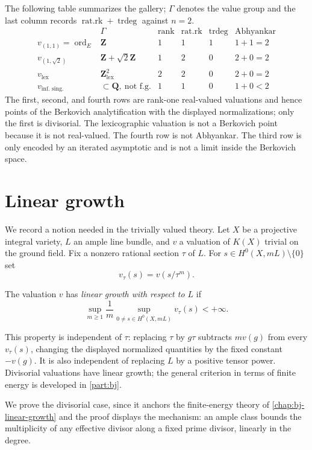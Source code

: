 The following table summarizes the gallery; $\Gamma$ denotes the value
group and the last column records
$\operatorname{rat.rk}+\operatorname{trdeg}$ against $n=2$.
\[
\begin{array}{l|c|c|c|c|c}
 &\Gamma&\operatorname{rank}&\operatorname{rat.rk}
 &\operatorname{trdeg}&\text{Abhyankar}\\
\hline
 v_{(1,1)}=\operatorname{ord}_E
 &\mathbf Z&1&1&1&1+1=2\\
 v_{(1,\sqrt2)}
 &\mathbf Z+\sqrt2\mathbf Z&1&2&0&2+0=2\\
 v_{\mathrm{lex}}
 &\mathbf Z^2_{\mathrm{lex}}&2&2&0&2+0=2\\
 v_{\text{inf.\ sing.}}
 &\subset\mathbf Q,\ \text{not f.g.}&1&1&0&1+0<2
\end{array}
\]
The first, second, and fourth rows are rank-one real-valued valuations and
hence points of the Berkovich analytification with the displayed
normalizations; only the first is divisorial.  The lexicographic valuation
is not a Berkovich point because it is not real-valued. The fourth row is
not Abhyankar. The third row is only encoded by an iterated asymptotic and is not a limit
inside the Berkovich space.

\section{Linear growth}

We record a notion needed in the trivially valued theory. Let $X$ be a
projective integral variety, $L$ an ample line bundle, and $v$ a valuation of
$K(X)$ trivial on the ground field. Fix a nonzero rational section $\tau$ of
$L$. For $s\in H^0(X,mL)\setminus\{0\}$ set
\[
                            v_\tau(s)=v(s/\tau^m).
\]

\begin{definition}\label{def:valuation-linear-growth}
The valuation $v$ has \emph{linear growth with respect to $L$} if
\[
  \sup_{m\geq1}\frac{1}{m}
  \sup_{0\ne s\in H^0(X,mL)}v_\tau(s)<+\infty.
\]
\end{definition}

This property is independent of $\tau$: replacing $\tau$ by $g\tau$ subtracts
$m v(g)$ from every $v_\tau(s)$, changing the displayed normalized quantities
by the fixed constant $-v(g)$. It is also independent of replacing $L$ by a
positive tensor power. Divisorial valuations have linear growth; the general
criterion in terms of finite energy is developed in \cref{part:bj}.

We prove the divisorial case, since it anchors the finite-energy theory of
\cref{chap:bj-linear-growth} and the proof displays the mechanism: an
ample class bounds the multiplicity of any effective divisor along a fixed
prime divisor, linearly in the degree.

